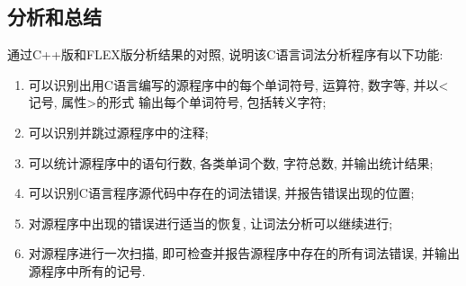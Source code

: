 \subsection{分析和总结}
通过C++版和FLEX版分析结果的对照, 说明该C语言词法分析程序有以下功能:
\begin{enumerate}
  \item 可以识别出用C语言编写的源程序中的每个单词符号, 运算符, 数字等,
  并以<记号, 属性>的形式 输出每个单词符号, 包括转义字符;
  \item 可以识别并跳过源程序中的注释;
  \item 可以统计源程序中的语句行数, 各类单词个数, 字符总数, 并输出统计结果;
  \item 可以识别C语言程序源代码中存在的词法错误, 并报告错误出现的位置;
  \item 对源程序中出现的错误进行适当的恢复, 让词法分析可以继续进行;
  \item 对源程序进行一次扫描, 即可检查并报告源程序中存在的所有词法错误, 并输出
  源程序中所有的记号.
\end{enumerate}
